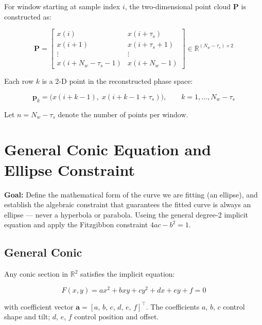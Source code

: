 \documentclass{article}
\begin{document}
	For window starting at sample index $i$, the two-dimensional
	point cloud $\mathbf{P}$ is constructed as:
	
	\begin{equation}
		\mathbf{P} =
		\begin{bmatrix}
			x(i)                  & x(i + \tau_s) \\
			x(i+1)                & x(i+\tau_s+1) \\
			\vdots                & \vdots \\
			x(i+N_w-\tau_s-1)    & x(i+N_w-1)
		\end{bmatrix}
		\in \mathbb{R}^{(N_w - \tau_s) \times 2}
	\end{equation}
	
	Each row $k$ is a 2-D point in the reconstructed phase space:
	
	\begin{equation}
		\mathbf{p}_k = \bigl(x(i+k-1),\; x(i+k-1+\tau_s)\bigr),
		\qquad k = 1, \ldots, N_w - \tau_s
	\end{equation}
	
	Let $n = N_w - \tau_s$ denote the number of points per window.
	
	
	\section{General Conic Equation and Ellipse Constraint}
	
	
	\textbf{Goal:} Define the mathematical form of the curve we
	are fitting (an ellipse), and establish the algebraic
	constraint that guarantees the fitted curve is always
	an ellipse --- never a hyperbola or parabola.
    Useing the general degree-2 implicit equation and
	apply the Fitzgibbon constraint $4ac - b^2 = 1$.
	
	\subsection{General Conic}
	
	Any conic section in $\mathbb{R}^2$ satisfies the implicit equation:
	
	\begin{equation}
		\boxed{F(x,y) = ax^2 + bxy + cy^2 + dx + ey + f = 0}
		\label{eq:conic}
	\end{equation}
	
	with coefficient vector $\mathbf{a} = [a,\, b,\, c,\, d,\, e,\, f]^\top$.
	The coefficients $a$, $b$, $c$ control shape and tilt;
	$d$, $e$, $f$ control position and offset.
	
\end{document}
